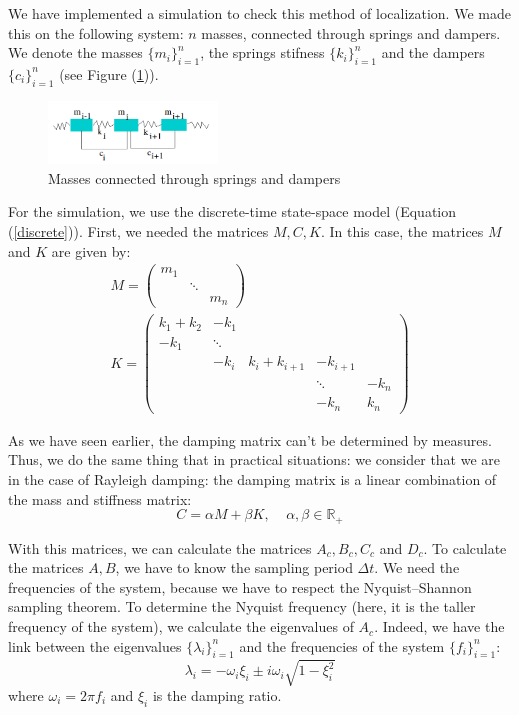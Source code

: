 \documentclass[journal]{IEEEtran}
\begin{document}
We have implemented a simulation to check this method of localization. We made this on the following system: $n$ masses, connected
through springs and dampers. We denote the masses $\{m_i\}_{i=1}^n$, the springs stifness $\{k_i\}_{i=1}^n$ and the dampers $\{c_i\}_{i=1}^n$ (see Figure (\ref{springs})).

\begin{figure}
  \centering
  \includegraphics[width=0.4\textwidth]{images/ressorts.png}
  \caption{Masses connected through springs and dampers}
  \label{springs}
\end{figure}

For the simulation, we use the discrete-time state-space model (Equation (\ref{discrete})). First, we needed the matrices $M, C, K$. In this case, the matrices $M$ and $K$ are given by:
\begin{equation}
\begin{array}{l}
M = 
\begin{pmatrix} 
m_1\\ 
&\ddots\\ 
&&m_n
\end{pmatrix} 
\\
K = 
\begin{pmatrix} 
k_1 + k_2 & - k_1 \\ 
- k_1 &\ddots\\ 
& -k_i & k_i + k_{i+1} & -k_{i+1} \\
&&&\ddots& -k_n\\
&&& -k_n & k_n
\end{pmatrix} 
\end{array}
\end{equation}

As we have seen earlier, the damping matrix can't be determined by measures.
Thus, we do the same thing that in practical situations: we consider that we are in the case of Rayleigh damping: the damping 
matrix is a linear combination of the mass and stiffness matrix:
\begin{equation}
C = \alpha M + \beta K,\ \ \ \ \ \alpha, \beta \in \mathbb{R}_+
\end{equation}

With this matrices, we can calculate the matrices $A_c, B_c, C_c$ and $D_c$. To calculate the matrices $A, B$, we have to know the 
sampling period $\Delta t$. We need the frequencies of the system, because we have to respect the Nyquist–Shannon sampling theorem.
To determine the Nyquist frequency (here, it is the taller frequency of the system), we calculate the eigenvalues of $A_c$. Indeed, we have the link between the eigenvalues $\{\lambda_i\}_{i=1}^n$ and the frequencies of the system $\{f_i\}_{i=1}^n$:
\begin{equation}
\lambda_i = - \omega_i \xi_i \pm i \omega_i \sqrt{1 - \xi_i^2}
\end{equation}
where $\omega_i = 2 \pi f_i$ and $\xi_i$ is the damping ratio.
\end{document}
